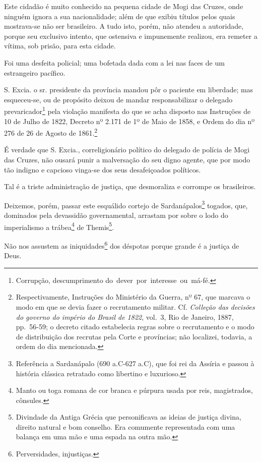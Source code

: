 Este cidadão é muito conhecido na pequena cidade de Mogi das Cruzes,
onde ninguém ignora a sua nacionalidade; além de que exibiu títulos
pelos quais mostrava-se não ser brasileiro. A tudo isto, porém, não
atendeu a autoridade, porque seu exclusivo intento, que ostensiva e
impunemente realizou, era remeter a vítima, sob prisão, para esta
cidade.

Foi uma desfeita policial; uma bofetada dada com a lei nas faces de um
estrangeiro pacífico.

S. Excia. o sr. presidente da província mandou pôr o paciente em
liberdade; mas esqueceu-se, ou de propósito deixou de mandar
responsabilizar o delegado prevaricador\footnote{Corrupção,
  descumprimento do~dever~por~interesse~ou~má-fé.} pela violação
manifesta do que se acha disposto nas Instruções de 10 de Julho de 1822,
Decreto nº 2.171 de 1º de Maio de 1858, e Ordem do dia nº 276 de 26 de
Agosto de 1861.\footnote{Respectivamente, Instruções do Ministério da
  Guerra, nº 67, que marcava o modo em que se devia fazer o recrutamento
  militar. Cf. \emph{Colleção das decisões do governo do império do
  Brasil de 1822}, vol.~3, Rio de Janeiro, 1887, pp.~56-59; o decreto
  citado estabelecia regras sobre o recrutamento e o modo de
  distribuição dos recrutas pela Corte e províncias; não localizei,
  todavia, a ordem do dia mencionada.}

É verdade que S. Excia., correligionário político do delegado de polícia
de Mogi das Cruzes, não ousará punir a malversação do seu digno agente,
que por modo tão indigno e capcioso vinga-se dos seus desafeiçoados
políticos.

Tal é a triste administração de justiça, que desmoraliza e corrompe os
brasileiros.

Deixemos, porém, passar este esquálido cortejo de
Sardanápalos\footnote{Referência a Sardanápalo (690 a.C-627 a.C), que
  foi rei da Assíria e passou à história clássica retratado como
  libertino e luxurioso.} togados, que, dominados pela devassidão
governamental, arrastam por sobre o lodo do imperialismo a
trábea\footnote{Manto ou toga romana de cor branca e púrpura usada por
  reis, magistrados, cônsules.} de Themis\footnote{Divindade da Antiga
  Grécia que personificava as ideias de justiça divina, direito natural
  e bom conselho. Era comumente representada com uma balança em uma mão
  e uma espada na outra mão.}.

Não nos assustem as iniquidades\footnote{Perversidades, injustiças.}
dos déspotas porque grande é a justiça de Deus.

